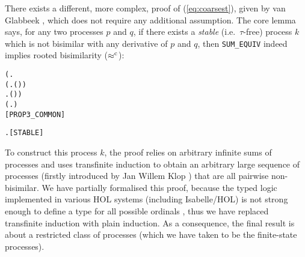 There exists a different, more complex, proof of (\ref{eq:coarsest}),
given by van Glabbeek \cite{van2005characterisation}, which does not
require any additional assumption.
The core lemma says, for
any two processes $p$ and $q$, if there exists a \emph{stable} (i.e.~$\tau$-free)
 process $k$ which is not bisimilar with any derivative of $p$ and
 $q$, then \texttt{SUM_EQUIV} indeed implies rooted bisimilarity ($\mathrel{\approx^{\rm{c}}}$):
\begin{alltt}
\HOLTokenTurnstile{} (\HOLSymConst{\HOLTokenExists{}}.
          \HOLSymConst{\HOLTokenConj{}} (\HOLSymConst{\HOLTokenForall{}} .  \HOLTokenWeakTransBegin{}\HOLTokenWeakTransEnd {} \HOLSymConst{\HOLTokenImp{}} \HOLSymConst{\HOLTokenNeg{}}( \HOLSymConst{\HOLTokenWeakEQ} )) \HOLSymConst{\HOLTokenConj{}}
        \HOLSymConst{\HOLTokenForall{}} .  \HOLTokenWeakTransBegin{}\HOLTokenWeakTransEnd {} \HOLSymConst{\HOLTokenImp{}} \HOLSymConst{\HOLTokenNeg{}}( \HOLSymConst{\HOLTokenWeakEQ} )) \HOLSymConst{\HOLTokenImp{}}
   (\HOLSymConst{\HOLTokenForall{}}.  \HOLSymConst{\ensuremath{+}}  \HOLSymConst{\HOLTokenWeakEQ}  \HOLSymConst{\ensuremath{+}} ) \HOLSymConst{\HOLTokenImp{}}
    \HOLSymConst{\HOLTokenObsCongr} \hfill{[PROP3_COMMON]}
\end{alltt}
\begin{alltt}
  \HOLSymConst{\HOLTokenEquiv{}} \HOLSymConst{\HOLTokenForall{}} .  \HOLTokenTransBegin{}\HOLTokenTransEnd {} \HOLSymConst{\HOLTokenImp{}}  \HOLSymConst{\HOLTokenNotEqual{}} \HOLSymConst{\ensuremath{\tau}}\hfill{[STABLE]}
\end{alltt}
To construct this process $k$,
 the proof relies on arbitrary infinite sums of 
processes and uses transfinite induction to obtain
an arbitrary large sequence of processes (firstly introduced by Jan
Willem Klop \cite{van2005characterisation})
 that are all pairwise non-bisimilar.
We have partially formalised
this proof, because the typed logic
implemented in various HOL systems (including Isabelle/HOL) is not
strong enough to define a type for all possible ordinals
\cite{norrish2013ordinals}, thus
we have replaced transfinite induction with plain induction. As a
consequence, the final
result is about a restricted class of processes (which we have taken
to be the finite-state processes).



